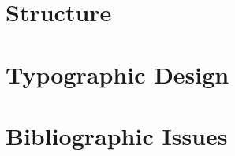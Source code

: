 \documentclass[a4paper,11pt,twoside]{memoir}
\begin{document}









\chapter{Structure}
\label{ch:structure}



\chapter{Typographic Design}
\label{ch:typo}



\chapter{Bibliographic Issues}
\label{ch:bibliographic}



\appendix

\backmatter
\listoffigures
\listoftables
\listofalgorithms
\listoffixmes



\end{document}
